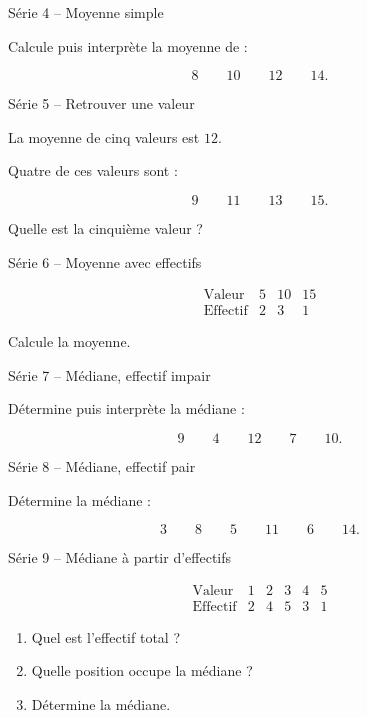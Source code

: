 \documentclass[aspectratio=169,11pt]{beamer}
\newcommand{\serie}[2]{%
\begin{frame}[t]{#1}
\vspace{0.25cm}
#2
\end{frame}
}
\begin{document}
\serie{Série 4 -- Moyenne simple}{

Calcule puis interprète la moyenne de :

\[
8\qquad10\qquad12\qquad14.
\]
}

\serie{Série 5 -- Retrouver une valeur}{

La moyenne de cinq valeurs est \(12\).

Quatre de ces valeurs sont :

\[
9\qquad11\qquad13\qquad15.
\]

\medskip

Quelle est la cinquième valeur ?
}

\serie{Série 6 -- Moyenne avec effectifs}{

\[
\begin{array}{c|ccc}
\text{Valeur} & 5 & 10 & 15\\
\hline
\text{Effectif} & 2 & 3 & 1
\end{array}
\]

\medskip

Calcule la moyenne.
}

\serie{Série 7 -- Médiane, effectif impair}{

Détermine puis interprète la médiane :

\[
9\qquad4\qquad12\qquad7\qquad10.
\]
}

\serie{Série 8 -- Médiane, effectif pair}{

Détermine la médiane :

\[
3\qquad8\qquad5\qquad11\qquad6\qquad14.
\]
}

\serie{Série 9 -- Médiane à partir d'effectifs}{

\[
\begin{array}{c|ccccc}
\text{Valeur} & 1 & 2 & 3 & 4 & 5\\
\hline
\text{Effectif} & 2 & 4 & 5 & 3 & 1
\end{array}
\]

\begin{enumerate}
  \item Quel est l'effectif total ?
  \item Quelle position occupe la médiane ?
  \item Détermine la médiane.
\end{enumerate}
}
\end{document}
